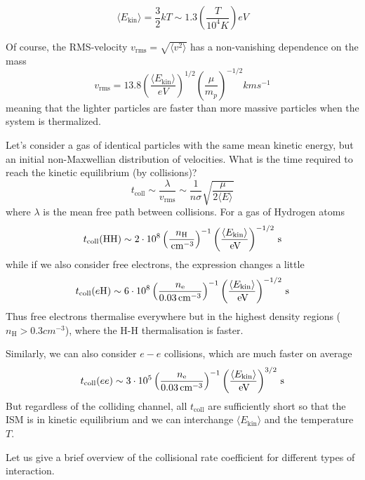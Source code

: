 \begin{equation}
    \langle E_{\text{kin}} \rangle = \frac{3}{2}kT \sim 1.3\left(\frac{T}{10^{4}\unit{K}}\right)\unit{eV}
\end{equation}
\par Of course, the RMS-velocity $v_{\text{rms}} = \sqrt{\langle v^{2} \rangle}$ has a non-vanishing dependence on the mass 
\begin{equation}
    v_{\text{rms}} = 13.8\left(\frac{\langle E_{\text{kin}} \rangle}{\unit{eV}}\right)^{1/2}\left(\frac{\mu}{m_{p}}\right)^{-1/2}\unit{km}\unit{s}^{-1}
\end{equation}
meaning that the lighter particles are faster than more massive particles when the system is thermalized.
\par Let's consider a gas of identical particles with the same mean kinetic energy, but an initial non-Maxwellian distribution of velocities. What is the time required to reach the kinetic equilibrium (by collisions)?
\begin{equation*}
    t_{\text{coll}} \sim \frac{\lambda}{v_{\text{rms}}} \sim \frac{1}{n\sigma}\sqrt{\frac{\mu}{2\langle E\rangle }}
\end{equation*}
where $\lambda$ is the mean free path between collisions. For a gas of Hydrogen atoms 
\begin{equation*}
    t_{\text{coll}}(\text{HH}) \sim 2\cdot 10^{8}\left(\frac{n_{\text{H}}}{\,\text{cm}^{-3}}\right)^{-1}\left(\frac{\langle E_{\text{kin}}\rangle}{\,\text{eV}}\right)^{-1/2}\,\text{s}
\end{equation*}
while if we also consider free electrons, the expression changes a little 
\begin{equation*}
     t_{\text{coll}}(e\text{H}) \sim 6\cdot 10^{8}\left(\frac{n_{\text{e}}}{0.03\,\text{cm}^{-3}}\right)^{-1}\left(\frac{\langle E_{\text{kin}}\rangle}{\,\text{eV}}\right)^{-1/2}\,\text{s}
\end{equation*}
Thus free electrons thermalise everywhere but in the highest density regions ($n_{\text{H}} > 0.3\unit{cm}^{-3}$), where the H-H thermalisation is faster.
\par Similarly, we can also consider $e-e$ collisions, which are much faster on average 
\begin{equation*}
     t_{\text{coll}}(ee) \sim 3\cdot 10^{5}\left(\frac{n_{\text{e}}}{0.03\,\text{cm}^{-3}}\right)^{-1}\left(\frac{\langle E_{\text{kin}}\rangle}{\,\text{eV}}\right)^{3/2}\,\text{s}
\end{equation*}
But regardless of the colliding channel, all $t_{\text{coll}}$ are suﬃciently short so that the ISM is in kinetic equilibrium and we can interchange $\langle E_{\text{kin}} \rangle$ and the temperature $T$.
\par Let us give a brief overview of the collisional rate coefficient for different types of interaction.

